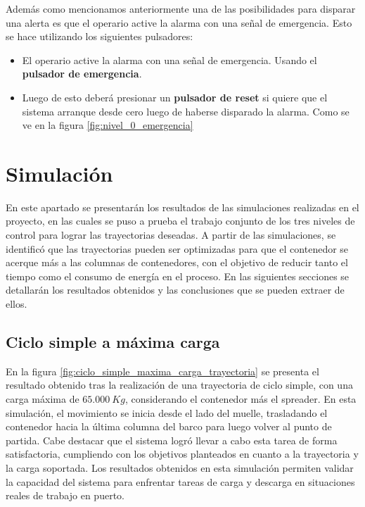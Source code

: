 \documentclass[11pt]{article}
\begin{document}
\newpage

Además como mencionamos anteriormente una de las posibilidades para disparar una alerta es que el operario active la alarma con una señal de emergencia. Esto se hace utilizando los siguientes pulsadores:
\begin{itemize}
	\item El operario active la alarma con una señal de emergencia. Usando el \textbf{pulsador de emergencia}.
	\item Luego de esto deberá presionar un \textbf{pulsador de reset} si quiere que el sistema arranque desde cero luego de haberse disparado la alarma. Como se ve en la figura \ref{fig:nivel_0_emergencia}
\end{itemize}

\section{Simulación}
En este apartado se presentarán los resultados de las simulaciones realizadas en el proyecto, en las cuales se puso a prueba el trabajo conjunto de los tres niveles de control para lograr las trayectorias deseadas. A partir de las simulaciones, se identificó que las trayectorias pueden ser optimizadas para que el contenedor se acerque más a las columnas de contenedores, con el objetivo de reducir tanto el tiempo como el consumo de energía en el proceso. En las siguientes secciones se detallarán los resultados obtenidos y las conclusiones que se pueden extraer de ellos.

\subsection{Ciclo simple a máxima carga}

En la figura \ref{fig:ciclo_simple_maxima_carga_trayectoria} se presenta el resultado obtenido tras la realización de una trayectoria de ciclo simple, con una carga máxima de $65.000\ Kg$, considerando el contenedor más el spreader. En esta simulación, el movimiento se inicia desde el lado del muelle, trasladando el contenedor hacia la última columna del barco para luego volver al punto de partida. Cabe destacar que el sistema logró llevar a cabo esta tarea de forma satisfactoria, cumpliendo con los objetivos planteados en cuanto a la trayectoria y la carga soportada. Los resultados obtenidos en esta simulación permiten validar la capacidad del sistema para enfrentar tareas de carga y descarga en situaciones reales de trabajo en puerto.
\end{document}
